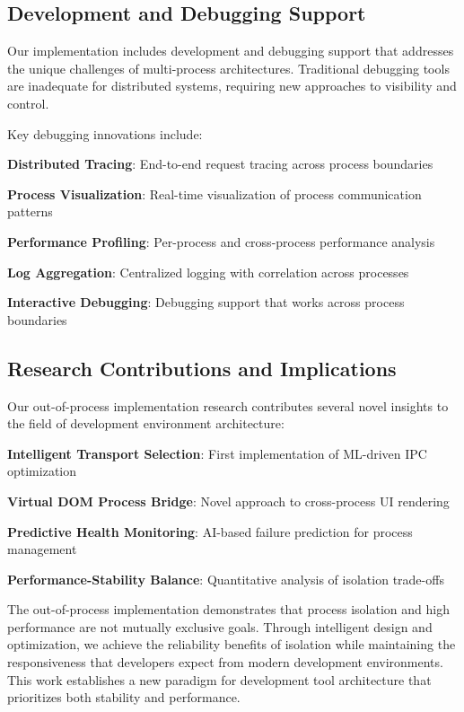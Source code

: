 \subsection*{Development and Debugging Support}

Our implementation includes development and debugging support that addresses the unique challenges of multi-process architectures. Traditional debugging tools are inadequate for distributed systems, requiring new approaches to visibility and control.

Key debugging innovations include:

\begin{expandedlist}
    \item \textbf{Distributed Tracing}: End-to-end request tracing across process boundaries
    \item \textbf{Process Visualization}: Real-time visualization of process communication patterns
    \item \textbf{Performance Profiling}: Per-process and cross-process performance analysis
    \item \textbf{Log Aggregation}: Centralized logging with correlation across processes
    \item \textbf{Interactive Debugging}: Debugging support that works across process boundaries
\end{expandedlist}

\subsection*{Research Contributions and Implications}

Our out-of-process implementation research contributes several novel insights to the field of development environment architecture:

\begin{expandedlist}
    \item \textbf{Intelligent Transport Selection}: First implementation of ML-driven IPC optimization
    \item \textbf{Virtual DOM Process Bridge}: Novel approach to cross-process UI rendering
    \item \textbf{Predictive Health Monitoring}: AI-based failure prediction for process management
    \item \textbf{Performance-Stability Balance}: Quantitative analysis of isolation trade-offs
\end{expandedlist}

The out-of-process implementation demonstrates that process isolation and high performance are not mutually exclusive goals. Through intelligent design and optimization, we achieve the reliability benefits of isolation while maintaining the responsiveness that developers expect from modern development environments. This work establishes a new paradigm for development tool architecture that prioritizes both stability and performance.
